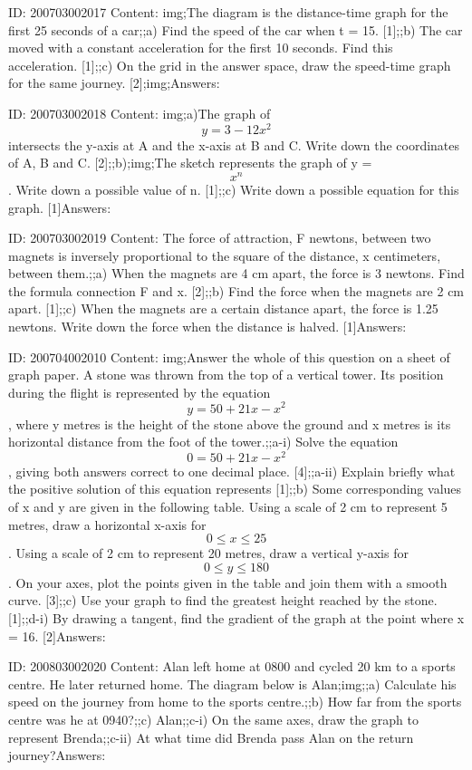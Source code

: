 \documentclass{article}
\begin{document}
ID: 200703002017
Content:
img;The diagram is the distance-time graph for the first 25 seconds of a car;;a) Find the speed of the car when t = 15. [1];;b) The car moved with a constant acceleration for the first 10 seconds. Find this acceleration. [1];;c) On the grid in the answer space, draw the speed-time graph for the same journey. [2];img;Answers:

ID: 200703002018
Content:
img;a)The graph of $$y=3-12x^{2} $$ intersects the y-axis at A and the x-axis at B and C. Write down the coordinates of A, B and C. [2];;b);img;The sketch represents the graph of y = $$x^{n}$$. Write down a possible value of n. [1];;c) Write down a possible equation for this graph. [1]Answers:

ID: 200703002019
Content:
The force of attraction, F newtons, between two magnets is inversely proportional to the square of the distance, x centimeters, between them.;;a) When the magnets are 4 cm apart, the force is 3 newtons. Find the formula connection F and x. [2];;b) Find the force when the magnets are 2 cm apart. [1];;c) When the magnets are a certain distance apart, the force is 1.25 newtons. Write down the force when the distance is halved. [1]Answers:

ID: 200704002010
Content:
img;Answer the whole of this question on a sheet of graph paper. A stone was thrown from the top of a vertical tower. Its position during the flight is represented by the equation $$y=50+21 x-x^{2}$$, where y metres is the height of the stone above the ground and x metres is its horizontal distance from the foot of the tower.;;a-i) Solve the equation $$0=50+21x-x^{2}$$, giving both answers correct to one decimal place. [4];;a-ii) Explain briefly what the positive solution of this equation represents [1];;b) Some corresponding values of x and y are given in the following table. Using a scale of 2 cm to represent 5 metres, draw a horizontal x-axis for $$0\leq x\leq 25$$. Using a scale of 2 cm to represent 20 metres, draw a vertical y-axis for $$0\leq y\leq 180$$. On your axes, plot the points given in the table and join them with a smooth curve. [3];;c) Use your graph to find the greatest height reached by the stone. [1];;d-i) By drawing a tangent, find the gradient of the graph at the point where x = 16. [2]Answers:

ID: 200803002020
Content:
Alan left home at 0800 and cycled 20 km to a sports centre. He later returned home. The diagram below is Alan;img;;a) Calculate his speed on the journey from home to the sports centre.;;b) How far from the sports centre was he at 0940?;;c) Alan;;c-i) On the same axes, draw the graph to represent Brenda;;c-ii) At what time did Brenda pass Alan on the return journey?Answers:
\end{document}
